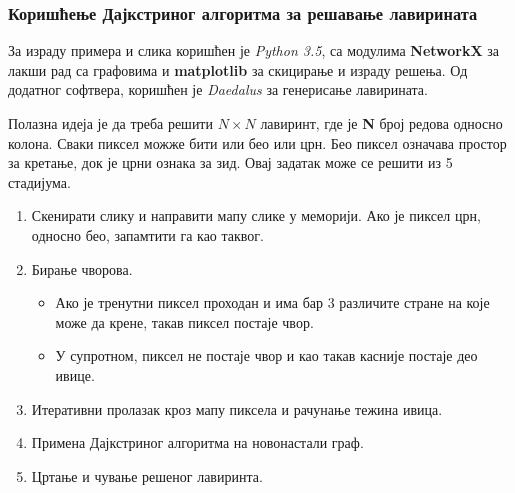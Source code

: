 \documentclass[11pt, oneside, a4paper]{article}
\begin{document}
\subsubsection*{Коришћење Дајкстриног алгоритма за решавање лавирината}
За израду примера и слика коришћен је \textit{Python 3.5}, са модулима \textbf{NetworkX} за лакши рад са графовима и \textbf{matplotlib} за скицирање и израду решења. Од додатног софтвера, коришћен је \textit{Daedalus} за генерисање лавирината. \par
Полазна идеја је да треба решити $N\times N$ лавиринт, где је \textbf{N} број редова односно колона. Сваки пиксел можже бити или бео или црн. Бео пиксел означава простор за кретање, док је црни ознака за зид. Овај задатак може се решити из 5 стадијума.
\begin{enumerate}
    \item Скенирати слику и направити мапу слике у меморији. Ако је пиксел црн, односно бео, запамтити га као таквог.
    \item Бирање чворова.
    \begin{itemize}
        \item Ако је тренутни пиксел проходан и има бар 3 различите стране на које може да крене, такав пиксел постаје чвор.
        \item У супротном, пиксел не постаје чвор и као такав касније постаје део ивице.
    \end{itemize}
    \item Итеративни пролазак кроз мапу пиксела и рачунање тежина ивица. 
    \item Примена Дајкстриног алгоритма на новонастали граф.
    \item Цртање и чување решеног лавиринта.
    
\end{enumerate}
\end{document}
